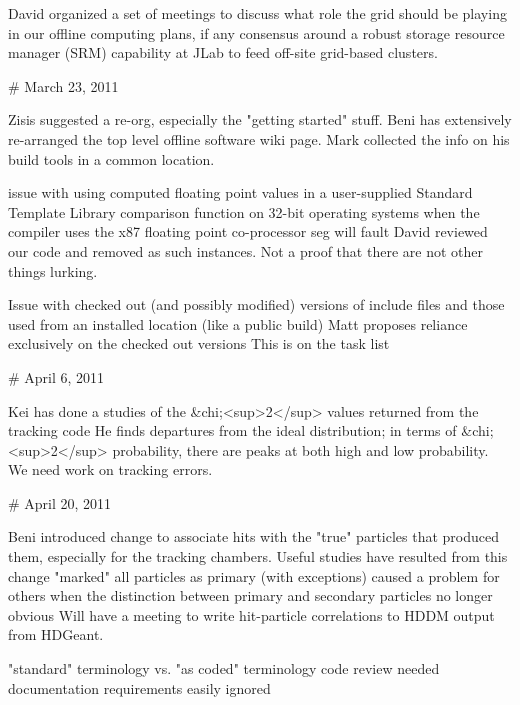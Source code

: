 
\bi
\I David organized a set of meetings to discuss what role the grid should be playing in our offline computing plans, if any
\I consensus around a robust storage resource manager (SRM) capability at JLab
 to feed off-site grid-based clusters.
\ei

# March 23, 2011


\bi
\I Zisis suggested a re-org, especially the "getting started" stuff.
\I Beni has extensively re-arranged the top level offline software wiki page.
\I Mark collected the info on his build tools in a common location.
\ei


\bi
\I issue with using computed floating point values in a user-supplied Standard Template Library comparison function on 32-bit operating systems when the compiler uses the x87 floating point co-processor
\I seg will fault
\I David reviewed our code and removed as such instances.
\I Not a proof that there are not other things lurking.
\ei


\bi
\I Issue with checked out (and possibly modified) versions of include files and those used from an installed location (like a public build)
\I Matt proposes reliance exclusively on the checked out versions
\I This is on the task list
\ei

# April 6, 2011


\I Kei has done a studies of the  &chi;<sup>2</sup> values returned from the tracking code
\I He finds departures from the ideal distribution; in terms of &chi;<sup>2</sup> probability, there are peaks at both high and low probability.
\I We need work on tracking errors.

# April 20, 2011


\I Beni introduced change to associate hits with the "true" particles that produced them, especially for the tracking chambers. Useful studies have resulted from this change
\I "marked" all particles as primary (with exceptions)
\I caused a problem for others when the distinction between primary and secondary particles no longer obvious
\I Will have a meeting to write hit-particle correlations to HDDM output from HDGeant.


\bi
\I "standard" terminology vs. "as coded" terminology
\I code review needed
\I documentation requirements easily ignored
\ei
